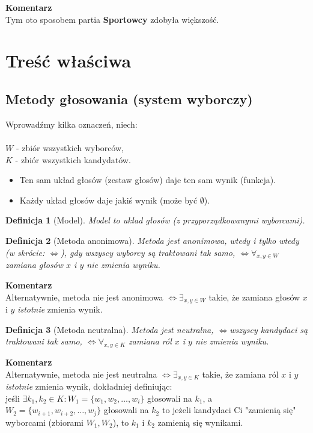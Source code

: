 \documentclass[12pt,a4paper]{article}
\theoremstyle{break}
\newcommand{\Komentarz}[1]{
	\begin{mdframed}[style=zadanie]
		\textbf{Komentarz}\\
		#1
	\end{mdframed}
	}
\newtheorem{definition}{Definicja}[section]
\newcommand{\witw}{$\Leftrightarrow$}
\begin{document}
\Komentarz{Tym oto sposobem partia \textbf{Sportowcy} zdobyła większość.}

	
\newpage

\section{Treść właściwa}
\subsection{Metody głosowania (system wyborczy)}

Wprowadźmy kilka oznaczeń, niech: \\
\\ $W$ - zbiór wszystkich wyborców, \\
$K$ - zbiór wszystkich kandydatów.
\begin{itemize}
	\item Ten sam układ głosów (zestaw głosów) daje ten sam wynik (funkcja).
	\item Każdy układ głosów daje jakiś wynik (może być $\emptyset$).
\end{itemize}

\begin{definition}[Model]
	Model to układ głosów (z przyporządkowanymi wyborcami).
\end{definition}

\begin{definition}[Metoda anonimowa]
	Metoda jest anonimowa, \textit{wtedy i tylko wtedy} (w skrócie: \witw), gdy wszyscy wyborcy są traktowani tak samo, \witw $\forall_{x,y \in W}$ zamiana głosów $x$ i $y$ nie zmienia wyniku.
\end{definition}

\Komentarz{Alternatywnie, metoda nie jest anonimowa \witw $\exists_{x,y \in W}$ takie, że zamiana głosów $x$ i $y$ \textit{istotnie} zmienia wynik.}

\begin{definition}[Metoda neutralna]
	Metoda jest neutralna, \witw wszyscy kandydaci są traktowani tak samo, \witw $\forall_{x,y \in K}$ zamiana ról $x$ i $y$ nie zmienia wyniku.
\end{definition}

\Komentarz{Alternatywnie, metoda nie jest neutralna \witw $\exists_{x,y \in K}$ takie, że zamiana ról $x$ i $y$ \textit{istotnie} zmienia wynik, dokładniej definiując:\\
jeśli $\exists{k_1,k_2\in K}: W_1=\{w_{1},w_{2},\dots,w_{i}\}$ głosowali na $k_1$, a $W_2=\{w_{i+1},w_{i+2},\dots,w_{j}\}$ głosowali na $k_2$ to jeżeli kandydaci Ci "zamienią się" wyborcami (zbiorami $W_1,W_2$), to $k_1$ i $k_2$ zamienią się wynikami.}
\end{document}
